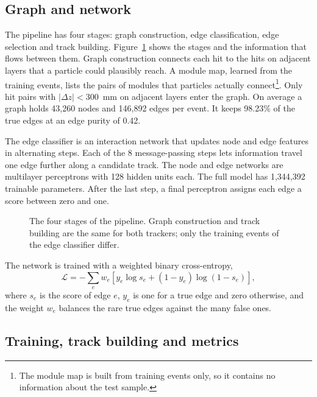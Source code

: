 \subsection{Graph and network}
\label{sec:graph}

The pipeline has four stages: graph construction, edge classification, edge selection and track building. Figure~\ref{fig:pipeline} shows the stages and the information that flows between them. Graph construction connects each hit to the hits on adjacent layers that a particle could plausibly reach. A module map, learned from the training events, lists the pairs of modules that particles actually connect\footnote{The module map is built from training events only, so it contains no information about the test sample.}. Only hit pairs with $|\Delta z| < 300$~mm on adjacent layers enter the graph. On average a graph holds 43,260 nodes and 146,892 edges per event. It keeps 98.23\% of the true edges at an edge purity of 0.42.

The edge classifier is an interaction network that updates node and edge features in alternating steps. Each of the 8 message-passing steps lets information travel one edge further along a candidate track. The node and edge networks are multilayer perceptrons with 128 hidden units each. The full model has 1,344,392 trainable parameters. After the last step, a final perceptron assigns each edge a score between zero and one.

\begin{figure}[tbp]
  \centering
  \caption{The four stages of the pipeline. Graph construction and track building are the same for both trackers; only the training events of the edge classifier differ.}
  \label{fig:pipeline}
\end{figure}

The network is trained with a weighted binary cross-entropy,
\begin{equation}
  \mathcal{L} = -\sum_{e} w_e \left[ y_e \log s_e + (1 - y_e) \log (1 - s_e) \right] ,
  \label{eq:loss}
\end{equation}
where $s_e$ is the score of edge $e$, $y_e$ is one for a true edge and zero otherwise, and the weight $w_e$ balances the rare true edges against the many false ones.

\subsection{Training, track building and metrics}
\label{sec:metrics}

